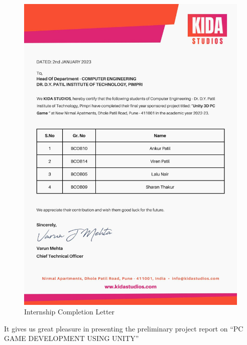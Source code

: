 \documentclass[12pt]{report}
\begin{document}
\begin{figure}[h]
\centering
\includegraphics[scale=0.2]{image3.png}
\caption{Internship Completion Letter}
\label{Sponsorship Letter}
\end{figure}

\clearpage


\vspace{4 cm}
\vspace{1 cm}
\justifying
\vspace{1 cm}
\justifying
\setlength{\parindent}{4em}
\setlength{\parskip}{1em}
\renewcommand{\baselinestretch}{1.5}
\normalsize
It gives us great pleasure in presenting the preliminary project report on “PC GAME DEVELOPMENT USING UNITY”
\end{document}
